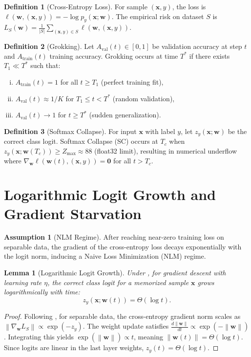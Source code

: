 \documentclass[11pt,a4paper]{article}
\theoremstyle{definition}
\newtheorem{definition}{Definition}[section]
\newtheorem{assumption}{Assumption}[section]
\theoremstyle{plain}
\newtheorem{lemma}{Lemma}[section]
\theoremstyle{remark}
\newcommand{\w}{\mathbf{w}}
\newcommand{\x}{\mathbf{x}}
\newcommand{\norm}[1]{\left\|#1\right\|}
\begin{document}
\begin{definition}[Cross-Entropy Loss]
\label{def:loss}
For sample $(\x, y)$, the loss is $\ell(\w, (\x, y)) = -\log p_y(\x; \w)$. The empirical risk on dataset $S$ is $L_S(\w) = \frac{1}{|S|} \sum_{(\x,y) \in S} \ell(\w, (\x, y))$.
\end{definition}

\begin{definition}[Grokking]
\label{def:grokking}
Let $A_{\text{val}}(t) \in [0,1]$ be validation accuracy at step $t$ and $A_{\text{train}}(t)$ training accuracy. Grokking occurs at time $T^*$ \cite{power2022grokking} if there exists $T_1 \ll T^*$ such that:
\begin{enumerate}[(i)]
    \item $A_{\text{train}}(t) = 1$ for all $t \geq T_1$ (perfect training fit),
    \item $A_{\text{val}}(t) \approx 1/K$ for $T_1 \leq t < T^*$ (random validation),
    \item $A_{\text{val}}(t) \to 1$ for $t \geq T^*$ (sudden generalization).
\end{enumerate}
\end{definition}

\begin{definition}[Softmax Collapse]
\label{def:softmax-collapse}
For input $\x$ with label $y$, let $z_y(\x; \w)$ be the correct class logit. Softmax Collapse (SC) occurs at $T_c$ when $z_y(\x; \w(T_c)) \geq Z_{\max} \approx 88$ (float32 limit), resulting in numerical underflow where $\nabla_{\w} \ell(\w(t), (\x, y)) = \mathbf{0}$ for all $t > T_c$.
\end{definition}

\section{Logarithmic Logit Growth and Gradient Starvation}
\label{sec:nlm}

\begin{assumption}[NLM Regime]
\label{ass:nlm}
After reaching near-zero training loss on separable data, the gradient of the cross-entropy loss decays exponentially with the logit norm, inducing a Naive Loss Minimization (NLM) regime.
\end{assumption}

\begin{lemma}[Logarithmic Logit Growth]
\label{lem:log-growth}
Under , for gradient descent with learning rate $\eta$, the correct class logit for a memorized sample $\x$ grows logarithmically with time:
\[
z_y(\x; \w(t)) = \Theta(\log t).
\]
\end{lemma}
\begin{proof}
Following \cite{soudry2018implicit}, for separable data, the cross-entropy gradient norm scales as $\norm{\nabla_{\w} L_S} \propto \exp(-z_y)$. The weight update satisfies $\frac{d\norm{\w}}{dt} \propto \exp(-\norm{\w})$. Integrating this yields $\exp(\norm{\w}) \propto t$, meaning $\norm{\w(t)} = \Theta(\log t)$. Since logits are linear in the last layer weights, $z_y(t) = \Theta(\log t)$.
\end{proof}
\end{document}

